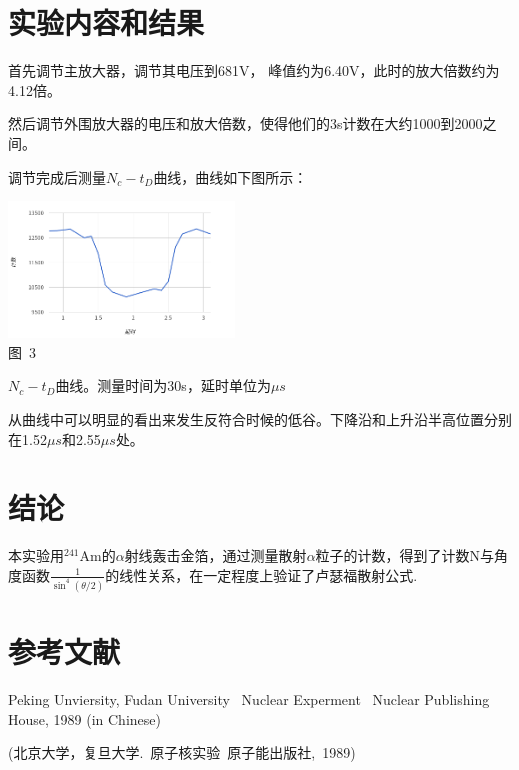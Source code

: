 \documentclass[a4paper,10.0pt,twoside]{npr}
\begin{document}
\begin{multicols}{2}
\section{实验内容和结果}
首先调节主放大器，调节其电压到681V， 峰值约为6.40V，此时的放大倍数约为4.12倍。

然后调节外围放大器的电压和放大倍数，使得他们的3s计数在大约1000到2000之间。

调节完成后测量$N_c-t_D$曲线，曲线如下图所示：

\begin{center}
   \includegraphics[width=0.45\textwidth]{1.png}
\\
\xiaowu\song 图~3\begin{minipage}[t]{75mm} \quad $N_c-t_D$曲线。测量时间为30s，延时单位为$\mu s$\\[-1mm]\wuhao
\end{minipage}
\end{center}

从曲线中可以明显的看出来发生反符合时候的低谷。下降沿和上升沿半高位置分别在1.52$\mu s$和2.55$\mu s$处。

\section{结论}

本实验用$^{241}$Am的$\alpha$射线轰击金箔，通过测量散射$\alpha$粒子的计数，得到了计数N与角度函数$\frac{1}{\sin^4(\theta/2)}$的线性关系，在一定程度上验证了卢瑟福散射公式. 

\section{参考文献}

\noindent
[1] Peking Unviersity, Fudan University \ Nuclear Experment
\ Nuclear Publishing House, 1989 (in Chinese)

\noindent
 (北京大学，复旦大学.\ 原子核实验\ 原子能出版社,\ 1989)

\end{multicols}

\newpage

\clearpage
\end{document}
